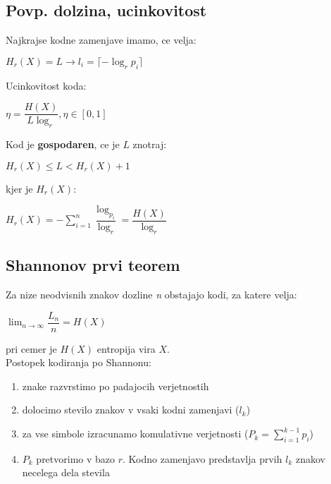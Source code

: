 \documentclass{article}
\begin{document}
\begin{multicols}{3}
\subsection{Povp. dolzina, ucinkovitost}
Najkrajse kodne zamenjave imamo, ce velja:
\begin{center}
    \begin{math}
        H_r(X) = L \rightarrow l_i = \lceil - \log_r p_i \rceil
    \end{math}
\end{center}
Ucinkovitost koda:
\begin{center}
    \begin{math}
        \eta = \dfrac{H(X)}{L \log_r}, \eta \in [0, 1]
    \end{math}
\end{center}
Kod je \textbf{gospodaren}, ce je $L$ znotraj:
\begin{center}
    \begin{math}
        H_r(X) \leq L < H_r(X) + 1
    \end{math}
\end{center}
kjer je $H_r(X)$:
\begin{center}
    \begin{math}
        H_r(X) = -\sum^{n}_{i=1} \dfrac{\log_{p_i}}{\log_r} = \dfrac{H(X)}{\log_r}
    \end{math}
\end{center}

\subsection{Shannonov prvi teorem}
Za nize neodvisnih znakov dozline \textit{n} obstajajo kodi,
za katere velja:
\begin{center}
    \begin{math}
        \lim_{n \rightarrow \infty} \dfrac{L_n}{n} = H(X)
    \end{math}
\end{center}
pri cemer je $H(X)$ entropija vira $X$.\\
Postopek kodiranja po Shannonu:
\begin{enumerate}
    \item znake razvrstimo po padajocih verjetnostih
    \item dolocimo stevilo znakov v vsaki kodni zamenjavi ($l_k$)
    \item za vse simbole izracunamo komulativne verjetnosti ($P_k = \sum_{i=1}^{k-1} p_i$)
    \item $P_k$ pretvorimo v bazo $r$. Kodno zamenjavo predstavlja prvih $l_k$ znakov necelega dela stevila
\end{enumerate}


\end{multicols}
\end{document}
